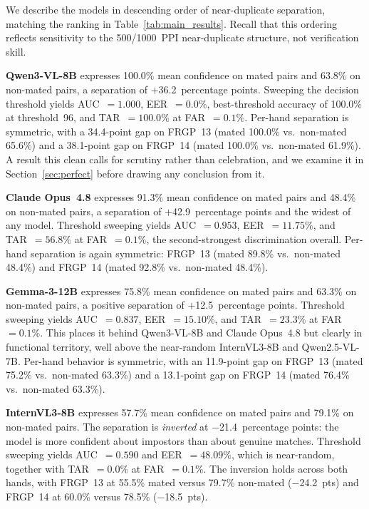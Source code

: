 \documentclass[journal]{IEEEtran}
\begin{document}
We describe the models in descending order of near-duplicate separation,
matching the ranking in Table~\ref{tab:main_results}. Recall that this ordering
reflects sensitivity to the 500/1000~PPI near-duplicate structure, not
verification skill.

\textbf{Qwen3-VL-8B} expresses 100.0\% mean confidence on mated pairs and
63.8\% on non-mated pairs, a separation of $+$36.2~percentage points.
Sweeping the decision threshold yields AUC~$= 1.000$, EER~$= 0.0\%$,
best-threshold accuracy of 100.0\% at threshold~96, and TAR~$= 100.0\%$ at
FAR~$= 0.1\%$.
Per-hand separation is symmetric, with a 34.4-point gap on FRGP~13
(mated 100.0\% vs.\ non-mated 65.6\%) and a 38.1-point gap on FRGP~14
(mated 100.0\% vs.\ non-mated 61.9\%).
A result this clean calls for scrutiny rather than celebration, and we
examine it in Section~\ref{sec:perfect} before drawing any conclusion from
it.

\textbf{Claude Opus~4.8} expresses 91.3\% mean confidence on mated pairs
and 48.4\% on non-mated pairs, a separation of $+$42.9~percentage points
and the widest of any model.
Threshold sweeping yields AUC~$= 0.953$, EER~$= 11.75\%$, and
TAR~$= 56.8\%$ at FAR~$= 0.1\%$, the second-strongest discrimination
overall.
Per-hand separation is again symmetric: FRGP~13 (mated 89.8\% vs.\
non-mated 48.4\%) and FRGP~14 (mated 92.8\% vs.\ non-mated 48.4\%).

\textbf{Gemma-3-12B} expresses 75.8\% mean confidence on mated pairs and
63.3\% on non-mated pairs, a positive separation of $+$12.5~percentage
points.
Threshold sweeping yields AUC~$= 0.837$, EER~$= 15.10\%$, and
TAR~$= 23.3\%$ at FAR~$= 0.1\%$. This places it behind Qwen3-VL-8B and
Claude Opus~4.8 but clearly in functional territory, well above the
near-random InternVL3-8B and Qwen2.5-VL-7B.
Per-hand behavior is symmetric, with an 11.9-point gap on FRGP~13
(mated 75.2\% vs.\ non-mated 63.3\%) and a 13.1-point gap on FRGP~14
(mated 76.4\% vs.\ non-mated 63.3\%).

\textbf{InternVL3-8B} expresses 57.7\% mean confidence on mated pairs and
79.1\% on non-mated pairs. The separation is \emph{inverted} at
$-$21.4~percentage points: the model is more confident about impostors than
about genuine matches.
Threshold sweeping yields AUC~$= 0.590$ and EER~$= 48.09\%$, which is
near-random, together with TAR~$= 0.0\%$ at FAR~$= 0.1\%$.
The inversion holds across both hands, with FRGP~13 at 55.5\% mated versus
79.7\% non-mated ($-$24.2~pts) and FRGP~14 at 60.0\% versus 78.5\%
($-$18.5~pts).
\end{document}
